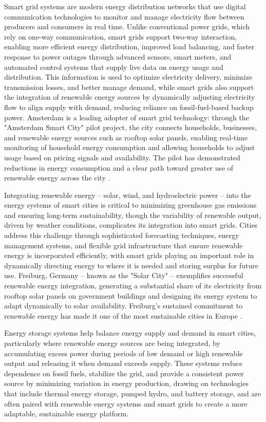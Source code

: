 \documentclass[journal]{IEEEtran}
\begin{document}
Smart grid systems are modern energy distribution networks that use digital communication technologies to monitor and manage electricity flow between producers and consumers in real time. Unlike conventional power grids, which rely on one-way communication, smart grids support two-way interaction, enabling more efficient energy distribution, improved load balancing, and faster response to power outages through advanced sensors, smart meters, and automated control systems that supply live data on energy usage and distribution. This information is used to optimize electricity delivery, minimize transmission losses, and better manage demand, while smart grids also support the integration of renewable energy sources by dynamically adjusting electricity flow to align supply with demand, reducing reliance on fossil-fuel-based backup power. Amsterdam is a leading adopter of smart grid technology: through the "Amsterdam Smart City" pilot project, the city connects households, businesses, and renewable energy sources such as rooftop solar panels, enabling real-time monitoring of household energy consumption and allowing households to adjust usage based on pricing signals and availability. The pilot has demonstrated reductions in energy consumption and a clear path toward greater use of renewable energy across the city \cite{r79,r106}.

Integrating renewable energy -- solar, wind, and hydroelectric power -- into the energy systems of smart cities is critical to minimizing greenhouse gas emissions and ensuring long-term sustainability, though the variability of renewable output, driven by weather conditions, complicates its integration into smart grids. Cities address this challenge through sophisticated forecasting techniques, energy management systems, and flexible grid infrastructure that ensure renewable energy is incorporated efficiently, with smart grids playing an important role in dynamically directing energy to where it is needed and storing surplus for future use. Freiburg, Germany -- known as the "Solar City" -- exemplifies successful renewable energy integration, generating a substantial share of its electricity from rooftop solar panels on government buildings and designing its energy system to adapt dynamically to solar availability. Freiburg's sustained commitment to renewable energy has made it one of the most sustainable cities in Europe \cite{r80,r107}.

Energy storage systems help balance energy supply and demand in smart cities, particularly where renewable energy sources are being integrated, by accumulating excess power during periods of low demand or high renewable output and releasing it when demand exceeds supply. These systems reduce dependence on fossil fuels, stabilize the grid, and provide a consistent power source by minimizing variation in energy production, drawing on technologies that include thermal energy storage, pumped hydro, and battery storage, and are often paired with renewable energy systems and smart grids to create a more adaptable, sustainable energy platform.
\end{document}
